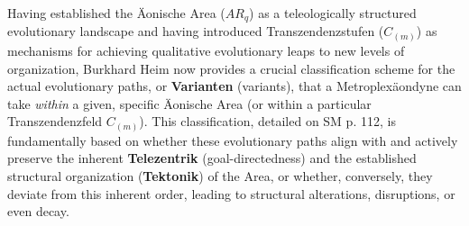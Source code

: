 \documentclass[12pt]{article}
\newcommand{\aeonischearea}{AR_q}
\begin{document}
Having established the Äonische Area (\(\aeonischearea\)) as a teleologically structured evolutionary landscape and having introduced Transzendenzstufen (\(C_{(m)}\)) as mechanisms for achieving qualitative evolutionary leaps to new levels of organization, Burkhard Heim now provides a crucial classification scheme for the actual evolutionary paths, or \textbf{Varianten} (variants), that a Metroplexäondyne can take \textit{within} a given, specific Äonische Area (or within a particular Transzendenzfeld \( C_{(m)} \)). This classification, detailed on SM p. 112, is fundamentally based on whether these evolutionary paths align with and actively preserve the inherent \textbf{Telezentrik} (goal-directedness) and the established structural organization (\textbf{Tektonik}) of the Area, or whether, conversely, they deviate from this inherent order, leading to structural alterations, disruptions, or even decay.
\end{document}
